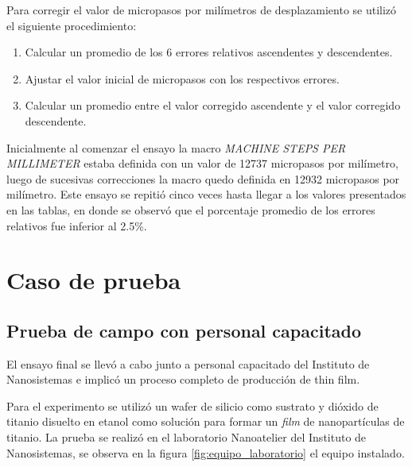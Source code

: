 Para corregir el valor de micropasos por milímetros de desplazamiento se utilizó el siguiente procedimiento:
\begin{enumerate}
\item Calcular un promedio de los 6 errores relativos ascendentes y descendentes.
\item Ajustar el valor inicial de micropasos con los respectivos errores. 
\item Calcular un promedio entre el valor corregido ascendente y el valor corregido descendente.
\end{enumerate}


Inicialmente al comenzar el ensayo la macro \textit{MACHINE STEPS PER MILLIMETER}  estaba definida con un valor de 12737 micropasos por milímetro, luego de sucesivas correcciones la macro quedo definida en 12932 micropasos por milímetro.
Este ensayo se repitió cinco veces hasta llegar a los valores presentados en las tablas, en donde se observó que el porcentaje promedio de los errores relativos fue inferior al 2.5\%.

\section{Caso de prueba}
\subsection{Prueba de campo con personal capacitado}

El ensayo final se llevó a cabo junto a personal capacitado del Instituto de Nanosistemas e implicó un proceso completo de producción de thin film.

Para el experimento se utilizó  un wafer de silicio como sustrato y dióxido de titanio disuelto en etanol como solución para formar un \textit{film} de nanopartículas de titanio. La prueba se realizó en el laboratorio Nanoatelier del Instituto de Nanosistemas, se observa en la figura \ref{fig:equipo_laboratorio} el equipo instalado.


